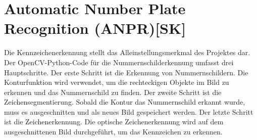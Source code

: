\section{Automatic Number Plate Recognition (ANPR)[SK]}
\label{lsg:def:anpr}
Die Kennzeichenerkennung stellt das Alleinstellungsmerkmal des Projektes dar. Der OpenCV-Python-Code für die Nummernschilderkennung umfasst drei Hauptschritte. Der erste Schritt ist die Erkennung von Nummernschildern. Die Konturfunktion wird verwendet, um die rechteckigen Objekte im Bild zu erkennen und das Nummernschild zu finden. Der zweite Schritt ist die Zeichensegmentierung. Sobald die Kontur das Nummernschild erkannt wurde, muss es ausgeschnitten und als neues Bild gespeichert werden. Der letzte Schritt ist die Zeichenerkennung. Die optische Zeichenerkennung wird auf dem ausgeschnittenen Bild durchgeführt, um das Kennzeichen zu erkennen.

